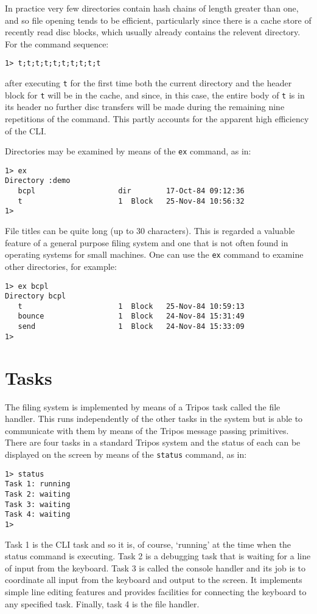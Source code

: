      In practice very few directories contain hash chains of length greater 
than one, and so file opening tends to be efficient, particularly since 
there is a cache store of recently read disc blocks, which usually already 
contains the relevent directory.  For the command sequence:
\begin{verbatim}
1> t;t;t;t;t;t;t;t;t;t
\end{verbatim}
\noindent
after executing \verb|t| for the first time both the current directory
and the header block for \verb|t| will be in the cache, and since, in
this case, the entire body of \verb|t| is in its header no further
disc transfers will be made during the remaining nine repetitions of
the command.  This partly accounts for the apparent high efficiency of
the CLI.

     Directories may be examined by means of the \verb|ex| command, as
in:
\begin{verbatim}
1> ex
Directory :demo
   bcpl                   dir        17-Oct-84 09:12:36
   t                      1  Block   25-Nov-84 10:56:32
1>
\end{verbatim}
File titles can be quite long (up to 30 characters).  This is regarded
a valuable feature of a general purpose filing system and one that is
not often found in operating systems for small machines.  One can use
the \verb|ex| command to examine other directories, for example:
\begin{verbatim}
1> ex bcpl
Directory bcpl
   t                      1  Block   25-Nov-84 10:59:13
   bounce                 1  Block   24-Nov-84 15:31:49
   send                   1  Block   24-Nov-84 15:33:09
1>
\end{verbatim}

\section{Tasks}

     The filing system is implemented by means of a Tripos task called
the file handler.  This runs independently of the other tasks in the
system but is able to communicate with them by means of the Tripos
message passing primitives.  There are four tasks in a standard Tripos
system and the status of each can be displayed on the screen by means
of the \verb|status| command, as in:
\begin{verbatim}
1> status
Task 1: running
Task 2: waiting
Task 3: waiting
Task 4: waiting
1>
\end{verbatim}
Task 1 is the CLI task and so it is, of course, `running' at the time
when the status command is executing.  Task 2 is a debugging task that
is waiting for a line of input from the keyboard.  Task 3 is called
the console handler and its job is to coordinate all input from the
keyboard and output to the screen.  It implements simple line editing
features and provides facilities for connecting the keyboard to any
specified task.  Finally, task 4 is the file handler.

